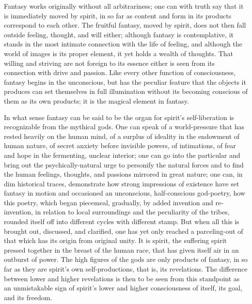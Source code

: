 \documentclass[12pt]{book}
\begin{document}
Fantasy works originally without all arbitrariness; one can with truth say that it is
immediately moved by spirit, in so far as content and form in its products correspond to each
other. The fruitful fantasy, moved by spirit, does not then fall outside feeling, thought, and
will either; although fantasy is contemplative, it stands in the most intimate connection with
the life of feeling, and although the world of images is its proper element, it yet holds a
wealth of thoughts. That willing and striving are not foreign to its essence either is seen
from its connection with drive and passion. Like every other function of consciousness, fantasy
begins in the unconscious, but has the peculiar feature that the objects it produces can set
themselves in full illumination without its becoming conscious of them as its own products; it
is the magical element in fantasy.

In what sense fantasy can be said to be the organ for spirit's self-liberation is recognizable
from the mythical gods. One can speak of a world-pressure that has rested heavily on the human
mind, of a surplus of ideality in the endowment of human nature, of secret anxiety before
invisible powers, of intimations, of fear and hope in the fermenting, unclear interior; one can
go into the particular and bring out the psychically-natural urge to personify the natural
forces and to find the human feelings, thoughts, and passions mirrored in great nature; one can,
in dim historical traces, demonstrate how strong impressions of existence have set fantasy in
motion and occasioned an unconscious, half-conscious god-poetry, how this poetry, which began
piecemeal, gradually, by added invention and re-invention, in relation to local surroundings and
the peculiarity of the tribes, rounded itself off into different cycles with different stamp. But
when all this is brought out, discussed, and clarified, one has yet only reached a
parceling-out of that which has its origin from original unity. It is spirit, the suffering
spirit pressed together in the breast of the human race, that has given itself air in an
outburst of power. The high figures of the gods are only products of fantasy, in so far as they
are spirit's own self-productions, that is, its revelations. The difference between lower and
higher revelations is then to be seen from this standpoint as an unmistakable sign of spirit's
lower and higher consciousness of itself, its goal, and its freedom.
\end{document}
